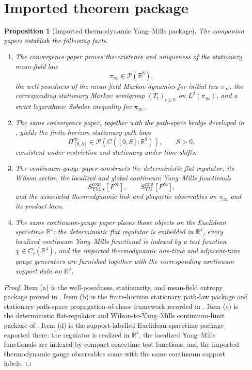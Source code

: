 \documentclass[11pt]{article}
\newtheorem{proposition}[theorem]{Proposition}
\theoremstyle{definition}
\theoremstyle{remark}
\newcommand{\R}{\mathbb R}
\newcommand{\mcP}{\mathcal P}
\begin{document}
\section{Imported theorem package}

\begin{proposition}[Imported thermodynamic Yang--Mills package]
\label{prop:imports}
The companion papers establish the following facts.
\begin{enumerate}[label=\textnormal{(\alph*)},leftmargin=1.5em]
\item The convergence paper \cite{convergence} proves the existence and
uniqueness of the stationary mean-field law
\[
\pi_\infty\in\mcP(\R^8),
\]
the well posedness of the mean-field Markov dynamics for initial law
\(\pi_\infty\), the corresponding stationary Markov semigroup \((T_t)_{t\ge0}\)
on \(L^2(\pi_\infty)\), and a strict logarithmic Sobolev inequality for
\(\pi_\infty\).
\item The same convergence paper, together with the path-space bridge developed
in \cite{continuumqft}, yields the finite-horizon stationary path laws
\[
\Pi_{[0,S]}^\infty\in\mcP(C([0,S];\R^8)),
\qquad S>0,
\]
consistent under restriction and stationary under time shifts.
\item The continuum-gauge paper \cite{continuumqft} constructs the deterministic
flat regulator, its Wilson sector, the localized and global continuum
Yang--Mills functionals
\[
S_{\mathrm{YM},\chi}^{\mathrm{cont}}[F^\infty],
\qquad
S_{\mathrm{YM}}^{\mathrm{cont}}[F^\infty],
\]
and the associated thermodynamic link and plaquette observables on
\(\pi_\infty\) and its product laws.
\item The same continuum-gauge paper places those objects on the Euclidean
spacetime \(\R^4\): the deterministic flat regulator is embedded in
\(\R^4\), every localized continuum Yang--Mills functional is indexed by a test
function \(\chi\in C_c(\R^4)\), and the imported thermodynamic one-time and
adjacent-time gauge generators are furnished together with the corresponding
continuum support data on \(\R^4\).
\end{enumerate}
\end{proposition}

\begin{proof}
Item \textnormal{(a)} is the well-posedness, stationarity, and mean-field
entropy package proved in \cite{convergence}.  Item \textnormal{(b)} is the
finite-horizon stationary path-law package and stationary path-space
propagation-of-chaos framework recorded in \cite{continuumqft}.  Item
\textnormal{(c)} is the deterministic flat-regulator and Wilson-to-Yang--Mills
continuum-limit package of \cite{continuumqft}.  Item \textnormal{(d)} is the
support-labelled Euclidean spacetime package exported there: the regulator is
realized in \(\R^4\), the localized Yang--Mills functionals are indexed by
compact spacetime test functions, and the imported thermodynamic gauge
observables come with the same continuum support labels.
\end{proof}
\end{document}
